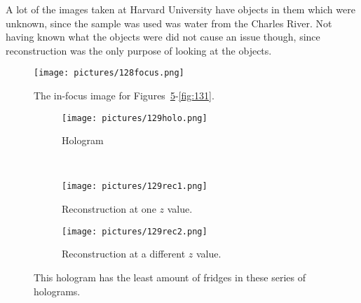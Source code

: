 A lot of the images taken at Harvard University have objects in them which were
unknown, since the sample was used was water from the Charles River. Not
having known what the objects were did not cause an issue though, since
reconstruction was the only purpose of looking at the objects.


\begin{figure}
    \begin{center}
        \texttt{[image: pictures/128focus.png]}
        \caption{The in-focus image for Figures~\ref{fig:129}-\ref{fig:131}. }
        \label{fig:128focus}
    \end{center}
\end{figure}





\begin{figure}[ht!]
    \begin{center}

        \begin{subfigure}[t]{0.4\textwidth}
            \label{fig:129holo}
            \texttt{[image: pictures/129holo.png]}
            \caption{Hologram}
        \end{subfigure}
        \\
        \begin{subfigure}[t]{0.4\textwidth}
            \label{fig:129rec1}
            \texttt{[image: pictures/129rec1.png]}
            \caption{Reconstruction at one $z$ value.}
        \end{subfigure}
                \hspace*{\fill}
%
        \begin{subfigure}[t]{0.4\textwidth}
            \label{fig:129rec2}
            \texttt{[image: pictures/129rec2.png]}
            \caption{Reconstruction at a different $z$ value.}
        \end{subfigure}


    \end{center}
    \caption{%
        This hologram has the least amount of fridges in these series of
        holograms.
    }%
    \label{fig:129}
\end{figure}


